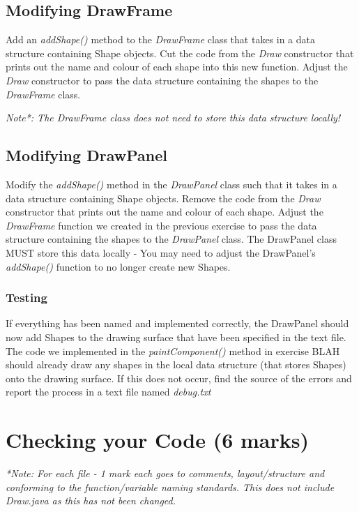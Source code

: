 \documentclass[a4paper,12pt]{article}
\begin{document}
\subsection{Modifying DrawFrame}
Add an \textit{addShape()} method to the \textit{DrawFrame} class that takes in a data structure containing Shape objects. Cut the code from the \textit{Draw} constructor that prints out the name and colour of each shape into this new function. Adjust the \textit{Draw} constructor to pass the data structure containing the shapes to the \textit{DrawFrame} class.

\textit{Note*: The DrawFrame class does not need to store this data structure locally!}

\subsection{Modifying DrawPanel}
Modify the \textit{addShape()} method in the \textit{DrawPanel} class such that it takes in a data structure containing Shape objects. Remove the code from the \textit{Draw} constructor that prints out the name and colour of each shape. Adjust the \textit{DrawFrame} function we created in the previous exercise to pass the data structure containing the shapes to the \textit{DrawPanel} class. The DrawPanel class MUST store this data locally - You may need to adjust the DrawPanel's \textit{addShape()} function to no longer create new Shapes.

\subsubsection{Testing}
If everything has been named and implemented correctly, the DrawPanel should now add Shapes to the drawing surface that have been specified in the text file. The code we implemented in the \textit{paintComponent()} method in exercise BLAH should already draw any shapes in the local data structure (that stores Shapes) onto the drawing surface. If this does not occur, find the source of the errors and report the process in a text file named \textit{debug.txt}


\newpage
\section{Checking your Code (6 marks)}
\textit{*Note: For each file - 1 mark each goes to comments, layout/structure and conforming to the function/variable naming standards. This does not include Draw.java as this has not been changed.}\\
\end{document}
